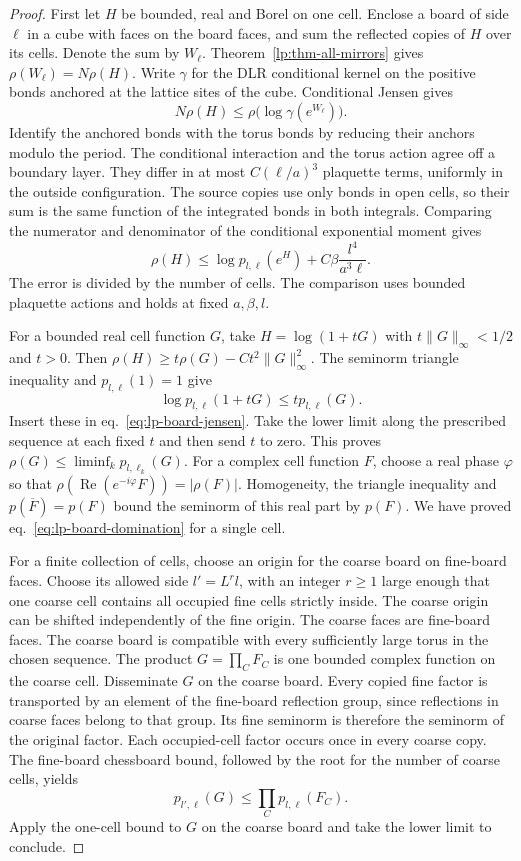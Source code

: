 \documentclass[11pt,letterpaper,reqno]{amsart}
\numberwithin{equation}{section}
\renewcommand{\eqref}[1]{\textup{eq.~\ref{#1}}}
\theoremstyle{definition}
\theoremstyle{remark}
\begin{document}
\begin{proof}
First let \(H\) be bounded, real and Borel on one cell. Enclose
a board of side \(\ell\) in a cube with faces on the board
faces, and sum the reflected copies of \(H\) over its cells.
Denote the sum by \(W_\ell\). Theorem~\ref{lp:thm-all-mirrors}
gives \(\rho(W_\ell)=N\rho(H)\).
Write \(\gamma\) for the DLR conditional kernel on the positive
bonds anchored at the lattice sites of the cube. Conditional
Jensen gives
\[
               N\rho(H)\le \rho\bigl(\log\gamma(e^{W_\ell})\bigr).
\]
Identify the anchored bonds with the torus bonds by reducing
their anchors modulo the period. The conditional interaction
and the torus action agree off a boundary layer. They differ
in at most \(C(\ell/a)^3\) plaquette terms, uniformly in the
outside configuration. The source copies use only bonds in
open cells, so their sum is the same function of the integrated
bonds in both integrals. Comparing the numerator and
denominator of the conditional exponential moment gives
\begin{equation}\label{eq:lp-board-jensen}
 \rho(H)\le \log p_{l,\ell}(e^H)
                   +C\beta\frac{l^4}{a^3\ell}.
\end{equation}
The error is divided by the number of cells. The comparison
uses bounded plaquette actions and holds at fixed \(a,\beta,l\).

For a bounded real cell function \(G\), take
\(H=\log(1+tG)\) with \(t\|G\|_\infty<1/2\) and \(t>0\).
Then \(\rho(H)\ge t\rho(G)-Ct^2\|G\|_\infty^2\).
The seminorm triangle inequality and \(p_{l,\ell}(1)=1\) give
\[
 \log p_{l,\ell}(1+tG)\le t p_{l,\ell}(G).
\]
Insert these in \eqref{eq:lp-board-jensen}. Take the lower
limit along the prescribed sequence at each fixed \(t\) and
then send \(t\) to zero. This proves
\(\rho(G)\le\liminf_k p_{l,\ell_k}(G)\).
For a complex cell function \(F\), choose a real phase
\(\varphi\) so that \(\rho(\operatorname{Re}(e^{-i\varphi}F))
=|\rho(F)|\). Homogeneity, the triangle inequality and
\(p(\overline F)=p(F)\) bound the seminorm of this real part
by \(p(F)\). We have proved \eqref{eq:lp-board-domination}
for a single cell.

For a finite collection of cells, choose an origin for the
coarse board on fine-board faces. Choose its allowed side
\(l'=L^r l\), with an integer \(r\ge1\) large enough that one coarse
cell contains all occupied fine cells strictly inside.
The coarse origin can be shifted independently of the fine
origin. The coarse faces are fine-board faces. The
coarse board is compatible with every sufficiently large
torus in the chosen sequence. The product \(G=\prod_C F_C\)
is one bounded complex function on the coarse cell.
Disseminate \(G\) on the coarse board. Every copied fine
factor is transported by an element of the fine-board
reflection group, since reflections in coarse faces belong
to that group. Its fine seminorm is therefore the seminorm
of the original factor. Each occupied-cell factor occurs
once in every coarse copy. The fine-board chessboard bound,
followed by the root for the number of coarse cells, yields
\[
                p_{l',\ell}(G)\le\prod_C p_{l,\ell}(F_C).
\]
Apply the one-cell bound to \(G\) on the coarse board and
take the lower limit to conclude.
\end{proof}
\end{document}

